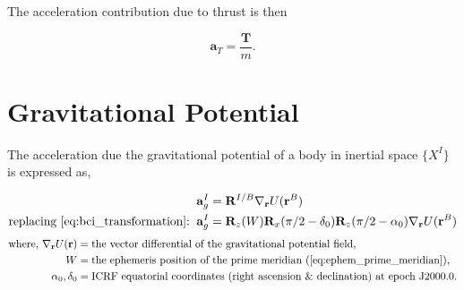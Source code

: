The acceleration contribution due to thrust is then

\begin{equation}
    \mathbf{a}_T = \frac{\mathbf{T}}{m}.
\end{equation}


\section{Gravitational Potential}\label{sec:gravitational_potential}

The acceleration due the gravitational potential of a body in inertial space $\{X^I\}$ is expressed as,


\begin{equation}
    \begin{aligned}
        \mathbf{a}_g^I &= \mathbf{R}^{I/B}\nabla_{\mathbf{r}}U(\mathbf{r}^B)\\
        \textrm{replacing \autoref{eq:bci_transformation}:}\;\;\mathbf{a}_g^I &=  \mathbf{R}_z(W)\mathbf{R}_x(\pi/2-\delta_0)\mathbf{R}_z(\pi/2-\alpha_0)\nabla_{\mathbf{r}}U(\mathbf{r}^B)
        \label{eq:accel_grav_pot}
    \end{aligned}
\end{equation}
\begin{equation*}
    \begin{aligned}
        \textrm{where, }
        \nabla_{\mathbf{r}}U(\mathbf{r}) &= \textrm{the vector differential of the gravitational potential field,} \\
        W &= \textrm{the ephemeris position of the prime meridian (\autoref{eq:ephem_prime_meridian}),}\\
        \alpha_0, \delta_0 &= \textrm{ICRF equatorial coordinates (right ascension \& declination) at epoch J2000.0.} \\
    \end{aligned}
\end{equation*}

